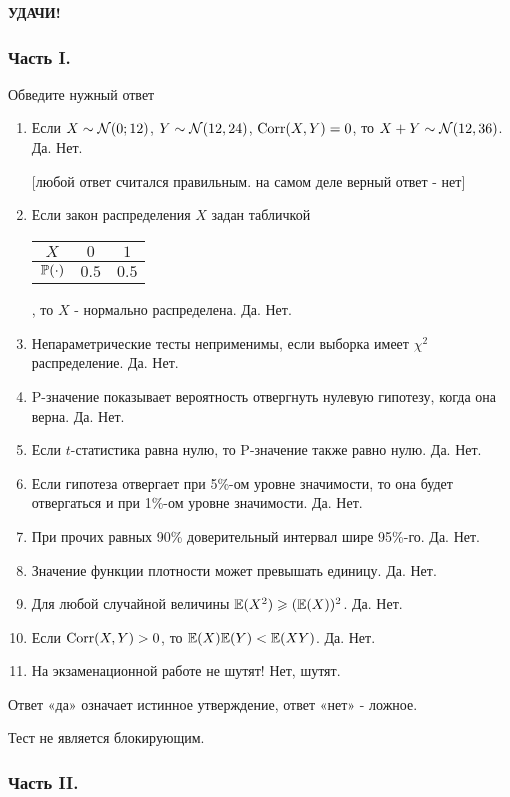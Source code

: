 \textbf{УДАЧИ!}

\subsubsection*{Часть I.}

Обведите нужный ответ

\begin{enumerate}
\item Если $X\sim \cN(0;12)$, $Y\sim \cN(12,24)$, $\Corr(X,Y)=0$, то
$X+Y\sim \cN(12,36)$.
Да. Нет.

$[$любой ответ считался правильным. на самом деле верный ответ -
нет$]$

\item Если закон распределения $X$ задан табличкой

\begin{tabular}{@{}ccc@{}}
\toprule
$X$      & $0$   & $1$   \\ \midrule
$\P(\cdot)$ & $0.5$ & $0.5$ \\ \bottomrule
\end{tabular}, то $X$ - нормально распределена. Да. Нет.

\item Непараметрические тесты неприменимы, если выборка имеет
$\chi^{2}$ распределение. Да. Нет.
\item P-значение показывает вероятность отвергнуть нулевую
гипотезу, когда она верна. Да. Нет.
\item Если $t$-статистика равна нулю, то P-значение также равно
нулю. Да. Нет.
\item Если гипотеза отвергает при 5\%-ом уровне значимости, то
она будет отвергаться и при 1\%-ом уровне значимости. Да. Нет.
\item При прочих равных 90\% доверительный интервал шире 95\%-го. Да. Нет.
\item Значение функции плотности может превышать единицу. Да. Нет.
\item Для любой случайной величины  $\E(X^{2} )\ge
(\E(X))^{2}$. Да. Нет.
\item Если $\Corr(X,Y)>0$, то $\E(X)\E(Y)<\E(XY)$. Да. Нет.
\item На экзаменационной работе не шутят! Нет, шутят.
\end{enumerate}

Ответ «да» означает истинное утверждение, ответ «нет» - ложное.

Тест не является блокирующим.


\subsubsection*{Часть II.}

